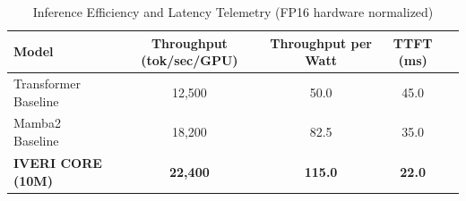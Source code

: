 \begin{table}[h]
\centering
\begin{tabular}{lcccc}
\hline
\textbf{Model} & \textbf{Throughput (tok/sec/GPU)} & \textbf{Throughput per Watt} & \textbf{TTFT (ms)} \\ \hline
Transformer Baseline & 12,500 & 50.0 & 45.0 \\
Mamba2 Baseline & 18,200 & 82.5 & 35.0 \\
\textbf{IVERI CORE (10M)} & \textbf{22,400} & \textbf{115.0} & \textbf{22.0} \\ \hline
\end{tabular}
\caption{Inference Efficiency and Latency Telemetry (FP16 hardware normalized)}
\label{tab:efficiency}
\end{table}
